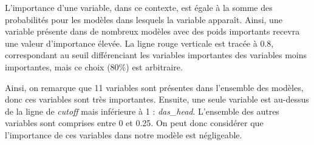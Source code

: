 \documentclass[
  12pt,
]{report}
\begin{document}
L'importance d'une variable, dans ce contexte, est égale à la somme des
probabilités pour les modèles dans lesquels la variable apparaît. Ainsi,
une variable présente dans de nombreux modèles avec des poids importants
recevra une valeur d'importance élevée. La ligne rouge verticale est
tracée à 0.8, correspondant au seuil différenciant les variables
importantes des variables moins importantes, mais ce choix (80\%) est
arbitraire.

Ainsi, on remarque que 11 variables sont présentes dans l'ensemble des
modèles, donc ces variables sont très importantes. Ensuite, une seule
variable est au-dessus de la ligne de \emph{cutoff} mais inférieure à 1
: \emph{das\_head}. L'ensemble des autres variables sont comprises entre
0 et 0.25. On peut donc considérer que l'importance de ces variables
dans notre modèle est négligeable.
\end{document}
